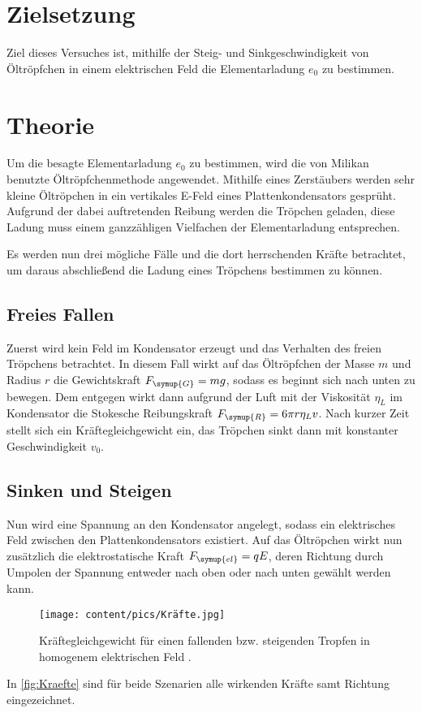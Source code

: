 \section{Zielsetzung}

Ziel dieses Versuches ist, mithilfe der Steig- und Sinkgeschwindigkeit von Öltröpfchen in einem
elektrischen Feld die Elementarladung $e_0$ zu bestimmen.

\section{Theorie}
\label{sec:Theorie}
Um die besagte Elementarladung $e_0$ zu bestimmen, wird die von Milikan benutzte Öltröpfchenmethode angewendet.
Mithilfe eines Zerstäubers werden sehr kleine Öltröpchen in ein vertikales E-Feld eines Plattenkondensators gesprüht.
Aufgrund der dabei auftretenden Reibung werden die Tröpchen geladen, diese Ladung muss einem ganzzähligen
Vielfachen der Elementarladung entsprechen.

Es werden nun drei mögliche Fälle und die dort herrschenden Kräfte betrachtet, um daraus abschließend die
Ladung eines Tröpchens bestimmen zu können.

\subsection{Freies Fallen}
Zuerst wird kein Feld im Kondensator erzeugt und das Verhalten des freien Tröpchens betrachtet.
In diesem Fall wirkt auf das Öltröpfchen der Masse $m$ und Radius $r$ die Gewichtskraft $F_{\symup{G}}=mg$, sodass
es beginnt sich nach unten zu bewegen.
Dem entgegen wirkt dann aufgrund der Luft mit der Viskosität $\eta_{L}$ im Kondensator
die Stokesche Reibungskraft $F_{\symup{R}}=6\pi r\eta_{L}v$.
Nach kurzer Zeit stellt sich ein Kräftegleichgewicht ein, das Tröpchen sinkt dann mit konstanter
Geschwindigkeit $v_0$.

\subsection{Sinken und Steigen}
Nun wird eine Spannung an den Kondensator angelegt, sodass ein elektrisches Feld zwischen den Plattenkondensators
existiert. Auf das Öltröpchen wirkt nun zusätzlich die elektrostatische Kraft $F_{\symup{el}}=qE$, deren Richtung
durch Umpolen der Spannung entweder nach oben oder nach unten gewählt werden kann.
\begin{figure} [H]
    \centering
    \texttt{[image: content/pics/Kräfte.jpg]}
    \caption{Kräftegleichgewicht für einen fallenden bzw. steigenden Tropfen in homogenem elektrischen Feld \cite{v503}.}
    \label{fig:Kraefte}
\end{figure}
In \autoref{fig:Kraefte} sind für beide Szenarien alle wirkenden Kräfte samt Richtung eingezeichnet.


